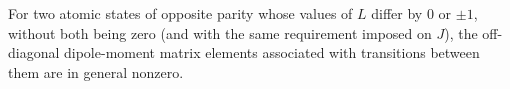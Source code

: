 For two atomic states of opposite parity whose values of $L$ differ by $0$ or $\pm1$, without both being zero (and with the same requirement imposed on $J$), the off-diagonal dipole-moment matrix elements associated with transitions between them are in general nonzero.
